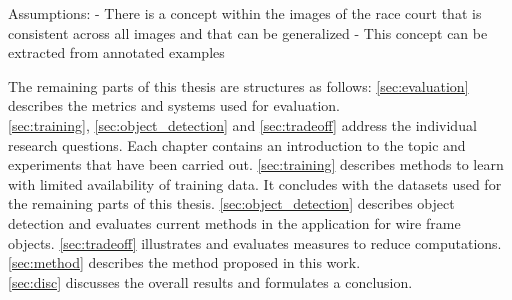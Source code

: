 Assumptions:
- There is a concept within the images of the race court that is consistent across all images and that can be generalized
- This concept can be extracted from annotated examples

The remaining parts of this thesis are structures as follows: \autoref{sec:evaluation} describes the metrics and systems used for evaluation.\\
 \autoref{sec:training}, \autoref{sec:object_detection} and \autoref{sec:tradeoff} address the individual research questions. Each chapter contains an introduction to the topic and experiments that have been carried out. \autoref{sec:training} describes methods to learn with limited availability of training data. It concludes with the datasets used for the remaining parts of this thesis.  \autoref{sec:object_detection} describes object detection and evaluates current methods in the application for wire frame objects.
\autoref{sec:tradeoff} illustrates and evaluates measures to reduce computations.
\autoref{sec:method} describes the method proposed in this work.\\
\autoref{sec:disc} discusses the overall results and formulates a conclusion.
